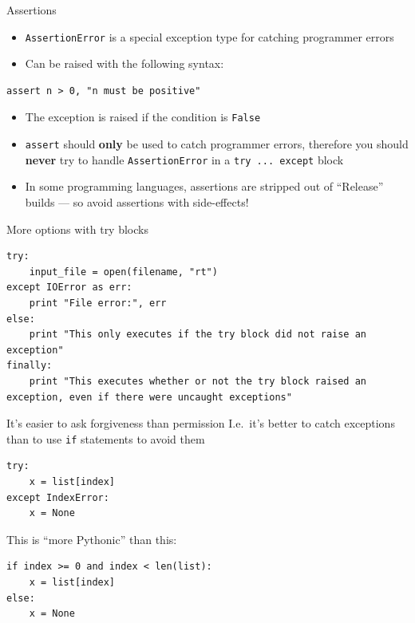 \begin{frame}[fragile]{Assertions}
	\begin{itemize}
		\pause\item \lstinline{AssertionError} is a special exception type for catching programmer errors
		\pause\item Can be raised with the following syntax:
	\end{itemize}
	\begin{lstlisting}
assert n > 0, "n must be positive"
	\end{lstlisting}
	\begin{itemize}
		\pause\item The exception is raised if the condition is \lstinline{False}
		\pause\item \lstinline{assert} should \textbf{only} be used to catch programmer errors,
			therefore you should \textbf{never} try to handle \lstinline{AssertionError} in a \lstinline{try ... except}
			block
		\pause\item In some programming languages, assertions are stripped out of ``Release'' builds ---
			so avoid assertions with side-effects!
	\end{itemize}
\end{frame}

\begin{frame}[fragile]{More options with try blocks}
	\begin{lstlisting}
try:
    input_file = open(filename, "rt")
except IOError as err:
    print "File error:", err
else:
    print "This only executes if the try block did not raise an exception"
finally:
    print "This executes whether or not the try block raised an exception, even if there were uncaught exceptions"
	\end{lstlisting}
\end{frame}

\begin{frame}[fragile]{It's easier to ask forgiveness than permission}
	\pause I.e.\ it's better to catch exceptions
		than to use \lstinline{if} statements to avoid them
	\pause\begin{lstlisting}
try:
    x = list[index]
except IndexError:
    x = None
	\end{lstlisting}
	This is ``more Pythonic'' than this:
	\pause\begin{lstlisting}
if index >= 0 and index < len(list):
    x = list[index]
else:
    x = None
	\end{lstlisting}
\end{frame}
